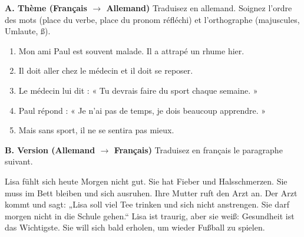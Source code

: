\documentclass[11pt]{article}
\begin{document}
\begin{exercice}

\textbf{A. Thème (Français $\rightarrow$ Allemand)}
Traduisez en allemand. Soignez l'ordre des mots (place du verbe, place du pronom réfléchi) et l'orthographe (majuscules, Umlaute, ß).
\begin{enumerate}
    \item Mon ami Paul est souvent malade. Il a attrapé un rhume hier.
    \item Il doit aller chez le médecin et il doit se reposer.
    \item Le médecin lui dit : « Tu devrais faire du sport chaque semaine. »
    \item Paul répond : « Je n'ai pas de temps, je dois beaucoup apprendre. »
    \item Mais sans sport, il ne se sentira pas mieux.
\end{enumerate}

\textbf{B. Version (Allemand $\rightarrow$ Français)}
Traduisez en français le paragraphe suivant.
\begin{textebox}[Version]
Lisa fühlt sich heute Morgen nicht gut. Sie hat Fieber und Halsschmerzen. Sie muss im Bett bleiben und sich ausruhen. Ihre Mutter ruft den Arzt an. Der Arzt kommt und sagt: „Lisa soll viel Tee trinken und sich nicht anstrengen. Sie darf morgen nicht in die Schule gehen.“ Lisa ist traurig, aber sie weiß: Gesundheit ist das Wichtigste. Sie will sich bald erholen, um wieder Fußball zu spielen.
\end{textebox}
\end{exercice}
\end{document}
